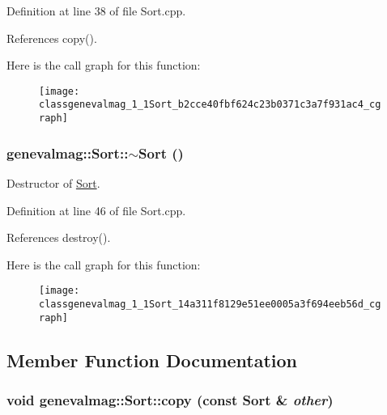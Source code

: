 Definition at line 38 of file Sort.cpp.

References copy().

Here is the call graph for this function:\nopagebreak
\begin{figure}[H]
\begin{center}
\leavevmode
\texttt{[image: classgenevalmag\_1\_1Sort\_b2cce40fbf624c23b0371c3a7f931ac4\_cgraph]}
\end{center}
\end{figure}
\hypertarget{classgenevalmag_1_1Sort_14a311f8129e51ee0005a3f694eeb56d}{
\subsubsection[{$\sim$Sort}]{\setlength{\rightskip}{0pt plus 5cm}genevalmag::Sort::$\sim$Sort ()}}
\label{classgenevalmag_1_1Sort_14a311f8129e51ee0005a3f694eeb56d}


Destructor of \hyperlink{classgenevalmag_1_1Sort}{Sort}. 

Definition at line 46 of file Sort.cpp.

References destroy().

Here is the call graph for this function:\nopagebreak
\begin{figure}[H]
\begin{center}
\leavevmode
\texttt{[image: classgenevalmag\_1\_1Sort\_14a311f8129e51ee0005a3f694eeb56d\_cgraph]}
\end{center}
\end{figure}


\subsection{Member Function Documentation}
\hypertarget{classgenevalmag_1_1Sort_b9686f0d43855db1167b7cf634d9d1fa}{
\subsubsection[{copy}]{\setlength{\rightskip}{0pt plus 5cm}void genevalmag::Sort::copy (const {\bf Sort} \& {\em other})}}
\label{classgenevalmag_1_1Sort_b9686f0d43855db1167b7cf634d9d1fa}


